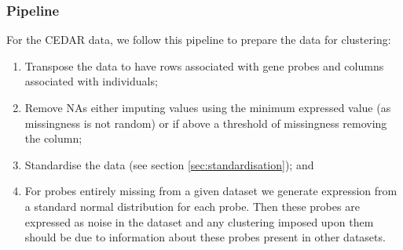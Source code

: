 \documentclass[12pt]{article} %
\begin{document}
	 	\subsubsection{Pipeline}
	For the CEDAR data, we follow this pipeline to prepare the data for clustering:
	\begin{enumerate} \label{list:methods}
		\item Transpose the data to have rows associated with gene probes and columns associated with individuals;
		\item Remove NAs either imputing values using the minimum expressed value (as missingness is not random) or if above a threshold of missingness removing the column;
		\item Standardise the data (see section \ref{sec:standardisation}); and
		\item For probes entirely missing from a given dataset we generate expression from a standard normal distribution for each probe. Then these probes are expressed as noise in the dataset and any clustering imposed upon them should be due to information about these probes present in other datasets. %
	\end{enumerate}
\end{document}

